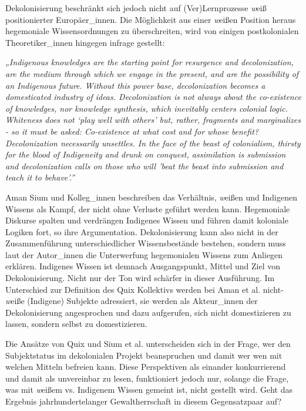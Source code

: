 Dekolonisierung beschränkt sich jedoch nicht auf (Ver)Lernprozesse \textit{w}eiß
positionierter Europäer\_innen. Die Möglichkeit aus einer \textit{w}eißen Position heraus
hegemoniale Wissensordnungen zu überschreiten, wird von einigen postkolonialen
Theoretiker\_innen hingegen infrage gestellt:

\begin{myenv}
  \textit{
  „Indigenous knowledges are the starting point for resurgence and
  decolonization, are the medium through which we engage in the present, and
  are the possibility of an Indigenous future. Without this power base,
  decolonization becomes a domesticated industry of ideas. Decolonization is
  not always about the co-existence of knowledges, nor knowledge synthesis,
  which inevitably centers colonial logic. Whiteness does not ‘play well with
  others’ but, rather, fragments and marginalizes - so it must be asked:
  Co-existence at what cost and for whose benefit? Decolonization necessarily
  unsettles. In the face of the beast of colonialism, thirsty for the blood of
  Indigeneity and drunk on conquest, assimilation is submission and
  decolonization calls on those who will 'beat the beast into submission and
  teach it to behave'.”\footnotemark{} }
\end{myenv}

Aman Sium und Kolleg\_innen beschreiben das Verhältnis, \textit{w}eißen und Indigenen
Wissens als Kampf, der nicht ohne Verluste geführt werden kann. Hegemoniale
Diskurse spalten und verdrängen Indigenes Wissen und führen damit koloniale
Logiken fort, so ihre Argumentation. Dekolonisierung kann also nicht in der
Zusammenführung unterschiedlicher Wissensbestände bestehen, sondern muss laut
der Autor\_innen die Unterwerfung hegemonialen Wissens zum Anliegen erklären.
Indigenes Wissen ist demnach Ausgangspunkt, Mittel und Ziel von
Dekolonisierung. Nicht nur der Ton wird schärfer in dieser Ausführung. Im
Unterschied zur Definition des Quix Kollektivs werden bei Aman et al.
nicht-\textit{w}eiße (Indigene) Subjekte adressiert, sie werden als Akteur\_innen der
Dekolonisierung angesprochen und dazu aufgerufen, sich nicht domestizieren zu
lassen, sondern selbst zu domestizieren.

Die Ansätze von Quix und Sium et al. unterscheiden sich in der Frage, wer den
Subjektstatus im dekolonialen Projekt beanspruchen und damit wer wen mit
welchen Mitteln befreien kann. Diese Perspektiven als einander konkurrierend
und damit als unvereinbar zu lesen, funktioniert jedoch nur, solange die Frage,
was mit \textit{w}eißem vs. Indigenem Wissen gemeint ist, nicht gestellt wird.
Geht das Ergebnis jahrhundertelanger Gewaltherrschaft in diesem Gegensatzpaar
auf?

